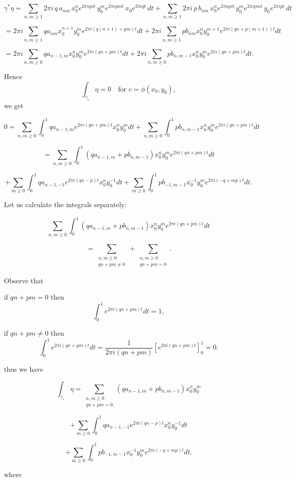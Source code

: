 \documentclass[11pt,a4paper]{amsart}
\theoremstyle{definition}
\begin{document}
\[
\gamma^*\eta
=
\sum_{n,m\ge 1}
2\pi i\, q\, a_{nm}\,
x_0^n e^{2\pi i q n t}\,
y_0^m e^{2\pi i p m t}\,
x_0 e^{2\pi i q t}\, dt
+
\sum_{n,m\ge 1}
2\pi i\, p\, b_{nm}\,
x_0^n e^{2\pi i q n t}\,
y_0^m e^{2\pi i p m t}\,
y_0 e^{2\pi i p t}\, dt
\]

\[
=
2\pi i \sum_{n,m\ge 1}
q a_{nm} x_0^{n+1} y_0^m
e^{2\pi i(q(n+1)+pm)t} dt
+
2\pi i \sum_{n,m\ge 1}
p b_{nm} x_0^{n} y_0^{m+1}
e^{2\pi i(qn+p(m+1))t} dt
\]

\[
=
2\pi i \sum_{n,m\ge 0}
q a_{n-1,m} x_0^n y_0^m
e^{2\pi i(qn+pm)t} dt
+
2\pi i \sum_{n,m\ge 0}
p b_{n,m-1} x_0^n y_0^m
e^{2\pi i(qn+pm)t} dt .
\]

Hence
\[
\int_{\gamma_c} \eta = 0
\quad \text{for } c=\phi(x_0,y_0),
\]
we get


\[
0
=
\sum_{n,m\ge 0}
\int_0^1
q a_{n-1,m} e^{2\pi i(qn+pm)t} x_0^n y_0^m dt
+
\sum_{n,m\ge 0}
\int_0^1
p b_{n,m-1} x_0^n y_0^m
e^{2\pi i(qn+pm)t} dt
\]

\[
=
\sum_{n,m\ge 0}
\int_0^1
(q a_{n-1,m}+p b_{n,m-1})
x_0^n y_0^m
e^{2\pi i(qn+pm)t} dt
\]

\[
+
\sum_{m\ge 0}
\int_0^1
q a_{n-1,-1}
e^{2\pi i(qn-p)t}
x_0^n y_0^{-1} dt
+
\sum_{m\ge 0}
\int_0^1
p b_{-1,m-1}
x_0^{-1} y_0^m
e^{2\pi i(-q+mp)t} dt .
\]


Let us calculate the integrals separately:

\[
\sum_{n,m\ge 0}
\int_0^1
(q a_{n-1,m}+p b_{n,m-1})
x_0^n y_0^m
e^{2\pi i(qn+pm)t} dt
\]

\[
=
\sum_{\substack{n,m\ge 0\\ qn+pm\neq 0}}
+
\sum_{\substack{n,m\ge 0\\ qn+pm=0}} .
\]


Observe that

if $qn+pm=0$ then
\[
\int_0^1 e^{2\pi i(qn+pm)t} dt = 1,
\]

if $qn+pm\neq 0$ then
\[
\int_0^1 e^{2\pi i(qn+pm)t} dt
=
\frac{1}{2\pi i(qn+pm)}
\left[e^{2\pi i(qn+pm)t}\right]_0^1
=
0.
\]

thus we have

\[
\int_{\gamma_c} \eta
=
\sum_{\substack{n,m\ge 0\\ qn+pm=0}}
(q a_{n-1,m}+p b_{n,m-1})
x_0^n y_0^m
\]

\[
+
\sum_{m\ge 0}
\int_0^1
q a_{n-1,-1}
e^{2\pi i(qn-p)t}
x_0^n y_0^{-1} dt
\]

\[
+
\sum_{m\ge 0}
\int_0^1
p b_{-1,m-1}
x_0^{-1} y_0^m
e^{2\pi i(-q+mp)t} dt .
\]


where
\end{document}
